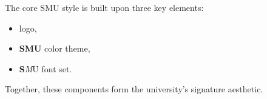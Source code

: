 \documentclass[12pt, aspectratio=169]{beamer}
\begin{document}
\begin{frame}{\insertsection}
\tableofcontents[currentsection]
\end{frame}

\begin{frame}{\insertsection}

The core SMU style is built upon three key elements:
\begin{itemize}
    \item {} logo,
    \item \textbf{{\textcolor{SMUBlue}{S}}{\textcolor{SMURed}{M}}{\textcolor{SMUYellow}{U}}} color theme,
    \item {\serif\textbf{S}\textit{M}U} font set.
\end{itemize}
Together, these components form the university's signature aesthetic.
\end{frame}
\end{document}
